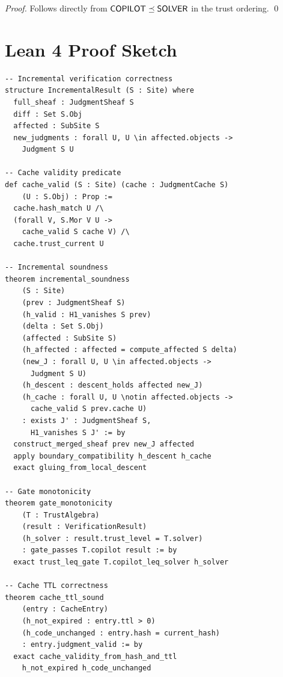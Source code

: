 \documentclass[11pt]{article}
\begin{document}
\begin{proof}
Follows directly from $\mathsf{COPILOT} \preceq \mathsf{SOLVER}$ in the trust ordering. \qed
\end{proof}

\section{Lean 4 Proof Sketch}\label{sec:lean}

\begin{lstlisting}[language=lean,basicstyle=\small\ttfamily,
  keywordstyle=\bfseries,frame=single,xleftmargin=1em]
-- Incremental verification correctness
structure IncrementalResult (S : Site) where
  full_sheaf : JudgmentSheaf S
  diff : Set S.Obj
  affected : SubSite S
  new_judgments : forall U, U \in affected.objects ->
    Judgment S U

-- Cache validity predicate
def cache_valid (S : Site) (cache : JudgmentCache S)
    (U : S.Obj) : Prop :=
  cache.hash_match U /\
  (forall V, S.Mor V U ->
    cache_valid S cache V) /\
  cache.trust_current U

-- Incremental soundness
theorem incremental_soundness
    (S : Site)
    (prev : JudgmentSheaf S)
    (h_valid : H1_vanishes S prev)
    (delta : Set S.Obj)
    (affected : SubSite S)
    (h_affected : affected = compute_affected S delta)
    (new_J : forall U, U \in affected.objects ->
      Judgment S U)
    (h_descent : descent_holds affected new_J)
    (h_cache : forall U, U \notin affected.objects ->
      cache_valid S prev.cache U)
    : exists J' : JudgmentSheaf S,
      H1_vanishes S J' := by
  construct_merged_sheaf prev new_J affected
  apply boundary_compatibility h_descent h_cache
  exact gluing_from_local_descent

-- Gate monotonicity
theorem gate_monotonicity
    (T : TrustAlgebra)
    (result : VerificationResult)
    (h_solver : result.trust_level = T.solver)
    : gate_passes T.copilot result := by
  exact trust_leq_gate T.copilot_leq_solver h_solver

-- Cache TTL correctness
theorem cache_ttl_sound
    (entry : CacheEntry)
    (h_not_expired : entry.ttl > 0)
    (h_code_unchanged : entry.hash = current_hash)
    : entry.judgment_valid := by
  exact cache_validity_from_hash_and_ttl
    h_not_expired h_code_unchanged
\end{lstlisting}
\end{document}
